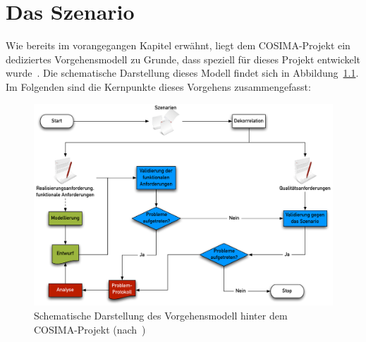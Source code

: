 
\chapter{Das Szenario} %
\label{cha:szenario}

  Wie bereits im vorangegangen Kapitel erwähnt, liegt dem COSIMA-Projekt ein dediziertes Vorgehensmodell zu Grunde, dass speziell für dieses Projekt entwickelt wurde~\citep[S. 7]{bericht}. Die schematische Darstellung dieses Modell findet sich in Abbildung~\ref{fig:vorgehensmodell}. Im Folgenden sind die Kernpunkte dieses Vorgehens zusammengefasst:

  \begin{figure}[!ht]
    \centering
      \includegraphics[width=.9\textwidth]{images/Vorgehensmodell}
    \caption{Schematische Darstellung des Vorgehensmodell hinter dem COSIMA-Projekt (nach~\citep{bericht})}
    \label{fig:vorgehensmodell}
  \end{figure}

